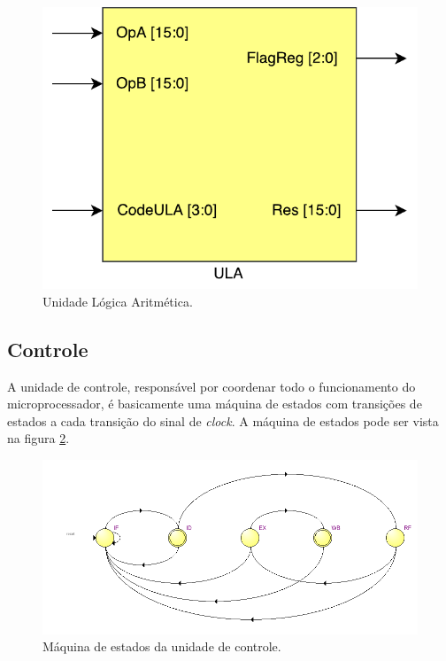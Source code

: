 \documentclass[11pt,a4paper,titlepage]{article}
\begin{document}
\begin{figure}[!h]
\centering
\includegraphics[scale=0.4]{images/ULA.pdf}
\caption{Unidade Lógica Aritmética.}
\label{fig:ula}
\end{figure}

\subsection{Controle}\label{subsec:imp-ctrl}

A unidade de controle, responsável por coordenar todo o funcionamento do microprocessador, é basicamente uma máquina de estados com transições de estados a cada transição do sinal de \textit{clock}. A máquina de estados pode ser vista na figura \ref{fig:statemachine}.

\begin{figure}[!h]
\centering
\includegraphics[scale=0.55]{images/statemachine.png}
\caption{Máquina de estados da unidade de controle.}
\label{fig:statemachine}
\end{figure}
\end{document}
